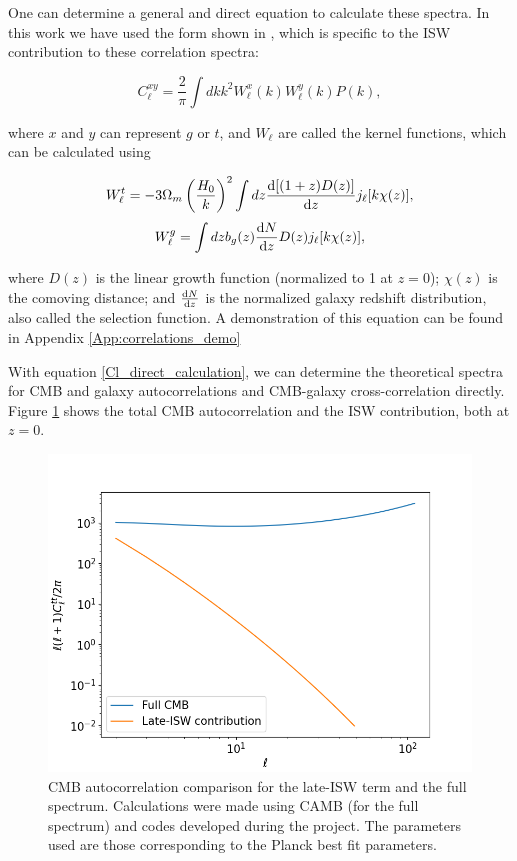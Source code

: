 \documentclass[openany,a4paper,12pt,oneside]{book}
\begin{document}
\begin{spacing}{1.5}
One can determine a general and direct equation to calculate these spectra. In this work we have used the form shown in \cite{Moura-Santos_2016}, which is specific to the ISW contribution to these correlation spectra:

\begin{equation}\label{Cl_direct_calculation}
    C^{xy}_\ell=\frac{2}{\pi}\int dk k^2 W_\ell^x(k)W_\ell^y(k)P(k),
\end{equation}

\noindent where $x$ and $y$ can represent $g$ or $t$, and $W_\ell$ are called the kernel functions, which can be calculated using

\begin{equation}\label{Wt}
    W_\ell^t=-3\Omega_m\left(\frac{H_0}{k}\right)^2\int dz \dv{[(1+z)D(z)]}{z} j_\ell[k\chi(z)],
\end{equation}
\begin{equation}\label{Wg}
    W_\ell^g=\int dz b_g(z)\dv{N}{z}D(z)j_\ell[k\chi(z)],
\end{equation}

\noindent where $D(z)$ is the linear growth function (normalized to 1 at $z=0$); $\chi(z)$ is the comoving distance; and $\dv{N}{z}$ is the normalized galaxy redshift distribution, also called the selection function\cite{cross_corr:Afshordi}. A demonstration of this equation can be found in Appendix \ref{App:correlations_demo}

With equation \eqref{Cl_direct_calculation}, we can determine the theoretical spectra for CMB and galaxy autocorrelations and CMB-galaxy cross-correlation directly. Figure \ref{fig:Ctt_ISW_comparison} shows the total CMB autocorrelation and the ISW contribution, both at $z=0$.

\begin{figure}[!htb]
    \centering
    \includegraphics[width=.75\linewidth]{Imagens/Ctt_comparison.png}
	\caption{CMB autocorrelation comparison for the late-ISW term and the full spectrum. Calculations were made using CAMB (for the full spectrum) and codes developed during the project. The parameters used are those corresponding to the Planck best fit parameters\cite{Planck_results}.}
    \label{fig:Ctt_ISW_comparison}
\end{figure}


\end{spacing}
\end{document}
